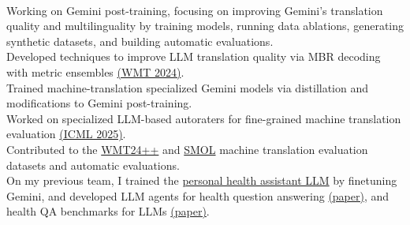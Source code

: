 
\\
Working on Gemini post-training, focusing on improving Gemini's translation quality and multilinguality by training models, running data ablations, generating synthetic datasets, and building automatic evaluations.\\
Developed techniques to improve LLM translation quality via MBR decoding with metric ensembles \href{https://aclanthology.org/2024.wmt-1.109.pdf}{(WMT 2024)}.\\
Trained machine-translation specialized Gemini models via distillation and modifications to Gemini post-training.\\
Worked on specialized LLM-based autoraters for fine-grained machine translation evaluation \href{https://arxiv.org/pdf/2411.15387}{(ICML 2025)}.\\
Contributed to the \href{https://arxiv.org/pdf/2502.12404}{WMT24++} and \href{https://arxiv.org/pdf/2502.12301}{SMOL} machine translation evaluation datasets and automatic evaluations.\\
On my previous team, I trained the \href{https://9to5google.com/2024/03/19/fitbit-labs-personal-health-llm/}{personal health assistant LLM} by finetuning Gemini, and developed LLM agents for health question answering \href{https://arxiv.org/pdf/2406.06464}{(paper)}, and health QA benchmarks for LLMs \href{https://arxiv.org/pdf/2305.15525}{(paper)}.\\

\vspace{-1mm}

